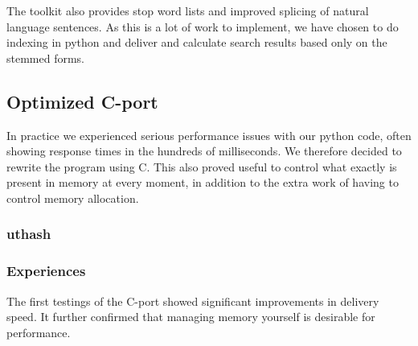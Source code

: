 The toolkit also provides stop word lists and improved splicing of natural language sentences. As this is a lot of work to implement, we have chosen to do indexing in python and deliver and calculate search results based only on the stemmed forms.

\subsection{Optimized C-port}
In practice we experienced serious performance issues with our python code, often showing response times in the hundreds of milliseconds. We therefore decided to rewrite the program using C. This also proved useful to control what exactly is present in memory at every moment, in addition to the extra work of having to control memory allocation.
\subsubsection{uthash}
\subsubsection{Experiences}
The first testings of the C-port showed significant improvements in delivery speed. It further confirmed that managing memory yourself is desirable for performance.

